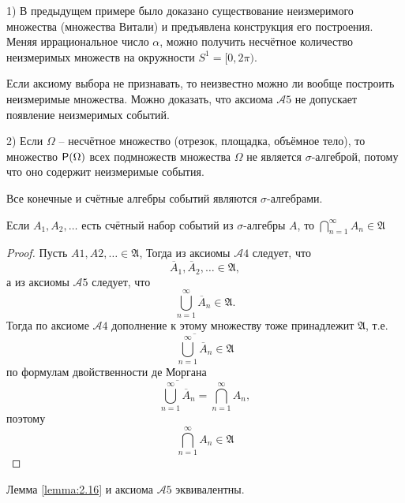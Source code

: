 \begin{zam}
	\label{zam:2.14}
1) В предыдущем примере было доказано существование неизмеримого множества (множества Витали) и предъявлена конструкция его построения. Меняя иррациональное число $\alpha$, можно получить несчётное количество неизмеримых множеств на окружности $S^1 = [0, 2\pi)$. 

Если аксиому выбора не признавать, то неизвестно можно ли вообще построить неизмеримые множества. Можно доказать, что аксиома $\mathcal{A}5$ не допускает появление неизмеримых событий.

2) Если $\Omega$ -- несчётное множество (отрезок, площадка, объёмное тело), то множество $\P(\Omega)$ всех подмножеств множества $\Omega$ не является $\sigma$-алгеброй, потому что оно содержит неизмеримые события.
\end{zam}

\begin{zam}
	\label{zam:2.15}
Все конечные и счётные алгебры событий являются $\sigma$-алгебрами.
\end{zam}

\begin{lemma}
	\label{lemma:2.16}
Если ${A_1 , A_2 , \ldots }$ есть счётный набор событий из $\sigma$-алгебры $A$, то $\bigcap\limits_{n=1}^\infty A_n\in\mathfrak{A}$
\end{lemma}

\begin{proof}
Пусть $A1 , A2 , \ldots \in \mathfrak{A}$, Тогда из аксиомы $\mathcal{A}4$ следует, что
	\begin{equation*}
		\overline{A}_1,\overline{A}_2, \ldots \in \mathfrak{A},
	\end{equation*}
а из аксиомы $\mathcal{A}5$ следует, что
	\begin{equation*}
		\bigcup\limits_{n=1}^\infty \overline{A}_n\in\mathfrak{A}.
	\end{equation*} 
Тогда по аксиоме $\mathcal{A}4$ дополнение к этому множеству тоже принадлежит $\mathfrak{A}$, т.е. 
	\begin{equation*}
		\overline{\bigcup\limits_{n=1}^\infty \overline{A}_n}\in\mathfrak{A}
	\end{equation*}
по формулам двойственности де Моргана
	\begin{equation*}
		\overline{\bigcup\limits_{n=1}^\infty \overline{A}_n}=\bigcap\limits_{n=1}^\infty {A}_n,
	\end{equation*} 
поэтому
	\begin{equation*}
		\bigcap\limits_{n=1}^\infty {A}_n\in\mathfrak{A}
	\end{equation*}

\end{proof}

\begin{consq}
	\label{consq:2.17}
	Лемма \ref{lemma:2.16} и аксиома $\mathcal{A}5$ эквивалентны.
\end{consq}